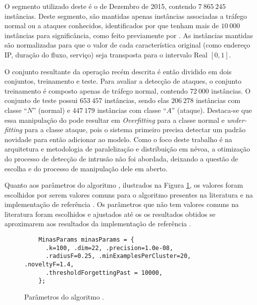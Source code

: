 O segmento utilizado deste \dataset é o de Dezembro de 2015, contendo $7\:865\:245$ instâncias.
Deste segmento, são mantidas apenas instâncias associadas a tráfego normal ou
a ataques conhecidos, identificados por \nids que tenham mais de $10\:000$ instâncias
para significância, como feito previamente por .
As instâncias mantidas são normalizadas para que o valor de cada característica
original (como endereço IP, duração do fluxo, serviço) seja transposta para o
intervalo Real $[0, 1]$.

O conjunto resultante da operação recém descrita é então dividido em dois
conjuntos, treinamento e teste.
Para avaliar a detecção de ataques, o conjunto treinamento é composto apenas de
tráfego normal, contendo $72\:000$ instâncias.
O conjunto de teste possui $653\:457$ instâncias, sendo elas
$206\:278$ instâncias com classe ``$N$'' (normal) e
$447\:179$ instâncias com classe ``$A$'' (ataque).
%
Destaca-se que essa manipulação do \dataset pode resultar em \emph{Overfitting} para a classe
normal e \emph{under-fitting} para a classe ataque, pois o sistema primeiro
precisa detectar um padrão novidade para então adicionar ao modelo. 
Como o foco deste trabalho é na arquitetura e metodologia de paralelização e
distribuição em névoa, a otimização do processo de detecção de intrusão não foi
abordada, deixando a questão de escolha \dataset e do processo de manipulação
dele em aberto.

Quanto aos parâmetros do algoritmo \minas, ilustrados na Figura
\ref{fig:params}, os valores foram escolhidos por serem valores comuns para o
algoritmo presentes na literatura \cite{Faria2013Minas,Faria2016minas} e na
implementação de referência  \cite{Faria2013source}.
Os parâmetros que não tem valores comuns na literatura foram escolhidos e ajustados até os
os resultados obtidos se aproximarem aos resultados da implementação de referência .

\begin{figure}[htb]
  \centering
  \begin{lstlisting}
    MinasParams minasParams = {
      .k=100, .dim=22, .precision=1.0e-08,
      .radiusF=0.25, .minExamplesPerCluster=20, .noveltyF=1.4,
      .thresholdForgettingPast = 10000,
    };
  \end{lstlisting}
  \caption{Parâmetros do algoritmo \minas.}
  \label{fig:params}
\end{figure}

